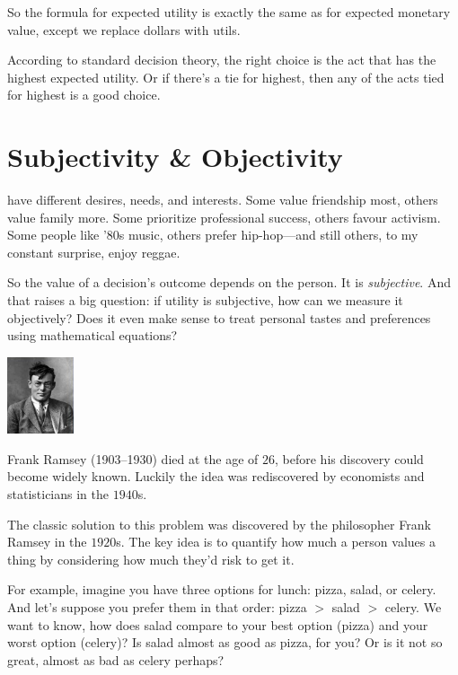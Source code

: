 \documentclass[justified]{tufte-book}
\newcommand{\gt}{>}
\theoremstyle{definition}
\theoremstyle{definition}
\theoremstyle{definition}
\theoremstyle{remark}
\begin{document}
So the formula for expected utility is exactly the same as for expected monetary value, except we replace dollars with utils.

According to standard decision theory, the right choice is the act that has the highest expected utility. Or if there's a tie for highest, then any of the acts tied for highest is a good choice.

\hypertarget{subjectivity-objectivity}{%
\section{Subjectivity \& Objectivity}\label{subjectivity-objectivity}}

 have different desires, needs, and interests. Some value friendship most, others value family more. Some prioritize professional success, others favour activism. Some people like '80s music, others prefer hip-hop---and still others, to my constant surprise, enjoy reggae.

So the value of a decision's outcome depends on the person. It is \emph{subjective}. And that raises a big question: if utility is subjective, how can we measure it objectively? Does it even make sense to treat personal tastes and preferences using mathematical equations?

\begin{marginfigure}
\includegraphics[width=0.77in]{img/ramsey} \caption[Frank Ramsey (1903--1930) died at the age of $26$, before his discovery could become widely known]{Frank Ramsey (1903--1930) died at the age of $26$, before his discovery could become widely known. Luckily the idea was rediscovered by economists and statisticians in the $1940$s.}\label{fig:ramsey}
\end{marginfigure}

The classic solution to this problem was discovered by the philosopher Frank Ramsey in the \(1920\)s. The key idea is to quantify how much a person values a thing by considering how much they'd risk to get it.

For example, imagine you have three options for lunch: pizza, salad, or celery. And let's suppose you prefer them in that order: pizza \(\gt\) salad \(\gt\) celery. We want to know, how does salad compare to your best option (pizza) and your worst option (celery)? Is salad almost as good as pizza, for you? Or is it not so great, almost as bad as celery perhaps?
\end{document}
